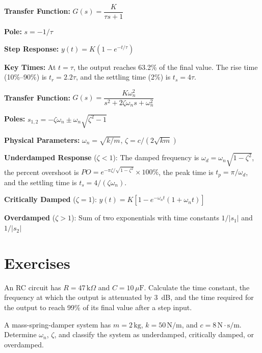 \begin{keyconceptbox}
\textbf{Transfer Function:} $G(s) = \dfrac{K}{\tau s + 1}$

\textbf{Pole:} $s = -1/\tau$

\textbf{Step Response:} $y(t) = K(1 - e^{-t/\tau})$

\textbf{Key Times:} At $t = \tau$, the output reaches 63.2\% of the final value. The rise time (10\%--90\%) is $t_r = 2.2\tau$, and the settling time (2\%) is $t_s = 4\tau$.
\end{keyconceptbox}

\begin{keyconceptbox}
\textbf{Transfer Function:} $G(s) = \dfrac{K\omega_n^2}{s^2 + 2\zeta\omega_n s + \omega_n^2}$

\textbf{Poles:} $s_{1,2} = -\zeta\omega_n \pm \omega_n\sqrt{\zeta^2 - 1}$

\textbf{Physical Parameters:} $\omega_n = \sqrt{k/m}$, \quad $\zeta = c/(2\sqrt{km})$

\textbf{Underdamped Response} ($\zeta < 1$): The damped frequency is $\omega_d = \omega_n\sqrt{1-\zeta^2}$, the percent overshoot is $PO = e^{-\pi\zeta/\sqrt{1-\zeta^2}} \times 100\%$, the peak time is $t_p = \pi/\omega_d$, and the settling time is $t_s = 4/(\zeta\omega_n)$.

\textbf{Critically Damped} ($\zeta = 1$): $y(t) = K[1 - e^{-\omega_n t}(1 + \omega_n t)]$

\textbf{Overdamped} ($\zeta > 1$): Sum of two exponentials with time constants $1/|s_1|$ and $1/|s_2|$
\end{keyconceptbox}

\newpage
\section{Exercises}

\begin{exercise}
An RC circuit has $R = 47\,\text{k}\Omega$ and $C = 10\,\mu\text{F}$. Calculate the time constant, the frequency at which the output is attenuated by 3~dB, and the time required for the output to reach 99\% of its final value after a step input.
\end{exercise}

\begin{exercise}
A mass-spring-damper system has $m = 2\,\text{kg}$, $k = 50\,\text{N/m}$, and $c = 8\,\text{N}\cdot\text{s/m}$. Determine $\omega_n$, $\zeta$, and classify the system as underdamped, critically damped, or overdamped.
\end{exercise}

